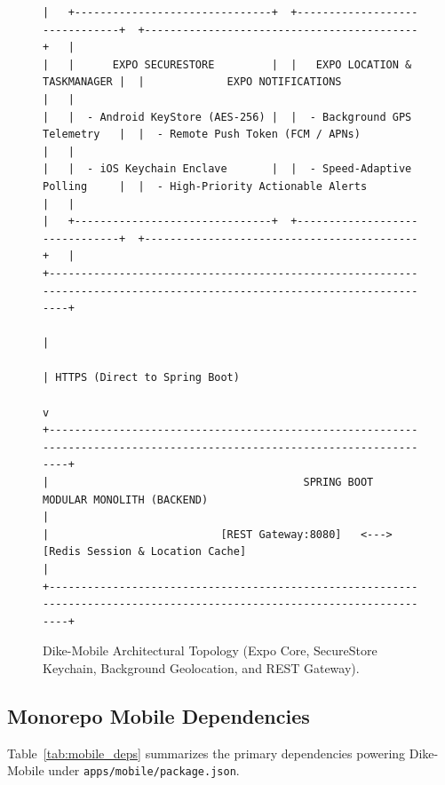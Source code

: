 \documentclass[conference,10pt,a4paper]{IEEEtran}
\begin{document}
\begin{figure}[!t]
\begin{lstlisting}[basicstyle=\ttfamily\fontsize{6pt}{7pt}\selectfont,frame=single,numbers=none]
|   +-------------------------------+  +-------------------------------+  +-------------------------------------------+   |
|   |      EXPO SECURESTORE         |  |   EXPO LOCATION & TASKMANAGER |  |             EXPO NOTIFICATIONS            |   |
|   |  - Android KeyStore (AES-256) |  |  - Background GPS Telemetry   |  |  - Remote Push Token (FCM / APNs)         |   |
|   |  - iOS Keychain Enclave       |  |  - Speed-Adaptive Polling     |  |  - High-Priority Actionable Alerts        |   |
|   +-------------------------------+  +-------------------------------+  +-------------------------------------------+   |
+-------------------------------------------------------------------------------------------------------------------------+
                                                           |
                                                           | HTTPS (Direct to Spring Boot)
                                                           v
+-------------------------------------------------------------------------------------------------------------------------+
|                                        SPRING BOOT MODULAR MONOLITH (BACKEND)                                           |
|                           [REST Gateway:8080]   <--->   [Redis Session & Location Cache]                                |
+-------------------------------------------------------------------------------------------------------------------------+
\end{lstlisting}
\caption{Dike-Mobile Architectural Topology (Expo Core, SecureStore Keychain, Background Geolocation, and REST Gateway).}
\label{fig:mobile_arch}
\end{figure}

\subsection{Monorepo Mobile Dependencies}
Table~\ref{tab:mobile_deps} summarizes the primary dependencies powering Dike-Mobile under \texttt{apps/mobile/package.json}.
\end{document}
